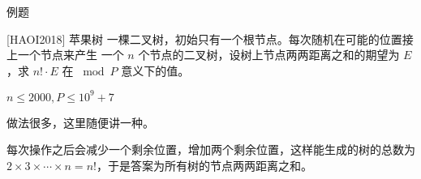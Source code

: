 \documentclass[UTF8]{beamer}
\begin{document}



        

    \begin{frame}{例题}
        \begin{block}{[HAOI2018] 苹果树}
            一棵二叉树，初始只有一个根节点。每次随机在可能的位置接上一个节点来产生
            一个 $n$ 个节点的二叉树，设树上节点两两距离之和的期望为 $E$，求 $n!\cdot E$ 在 $\bmod P$ 意义下的值。

            $n\le 2000, P\le 10^9+7$
        \end{block}

        \pause

        做法很多，这里随便讲一种。

        每次操作之后会减少一个剩余位置，增加两个剩余位置，这样能生成的树的总数为 $2\times 3\times \cdots \times n = n!$，于是答案为所有树的节点两两距离之和。

        
    \end{frame}
\end{document}
